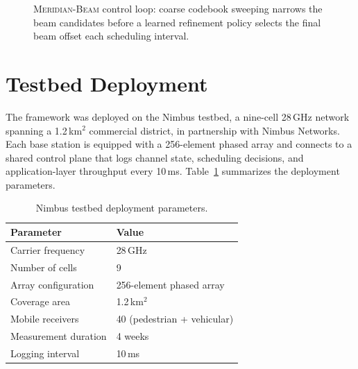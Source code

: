 \documentclass[12pt,a4paper]{report}
\begin{document}
\begin{figure}[htbp]
\centering
{}
\caption{\textsc{Meridian-Beam} control loop: coarse codebook sweeping narrows
the beam candidates before a learned refinement policy selects the final beam
offset each scheduling interval.}
\label{fig:architecture}
\end{figure}

\section{Testbed Deployment}
The framework was deployed on the Nimbus testbed, a nine-cell 28\,GHz
network spanning a 1.2\,km$^2$ commercial district, in partnership with
Nimbus Networks. Each base station is equipped with a 256-element phased
array and connects to a shared control plane that logs channel state,
scheduling decisions, and application-layer throughput every 10\,ms.
Table~\ref{tab:testbed} summarizes the deployment parameters.

\begin{table}[htbp]
\centering
\caption{Nimbus testbed deployment parameters.}
\label{tab:testbed}
\begin{tabular}{@{}ll@{}}
\toprule
\textbf{Parameter} & \textbf{Value} \\
\midrule
Carrier frequency & 28\,GHz \\
Number of cells & 9 \\
Array configuration & 256-element phased array \\
Coverage area & 1.2\,km$^2$ \\
Mobile receivers & 40 (pedestrian + vehicular) \\
Measurement duration & 4 weeks \\
Logging interval & 10\,ms \\
\bottomrule
\end{tabular}
\end{table}
\end{document}
